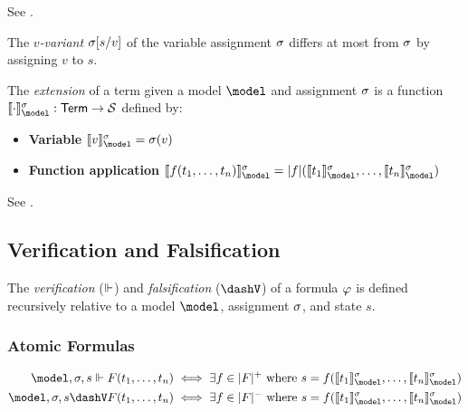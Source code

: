 \documentclass[../LogosReference.tex]{subfiles}
\begin{document}

\noindent
See .


\begin{definition}\label{def:variant-assignment}
	The \textit{$v$-variant} $\sigma[s/v]$ of the variable assignment $\sigma$ differs at most from $\sigma$ by assigning $v$ to $s$.
\end{definition}

\begin{definition}\label{def:term-extension}
	The \emph{extension} of a term given a model $\model$ and assignment $\sigma$ is a function $\sem{\cdot}^\assignment_\model : \Term \to \statespace$ defined by:
	\begin{itemize}
		\item \textbf{Variable} $\sem{v}^\assignment_\model = \assignment(v)$
		\item \textbf{Function application} $\sem{f(t_1, \ldots, t_n)}^\assignment_\model = \interp{f}(\sem{t_1}^\assignment_\model, \ldots, \sem{t_n}^\assignment_\model)$
	\end{itemize}
\end{definition}

\noindent
See .


\subsection{Verification and Falsification}\label{sec:verification-falsification}

The \emph{verification} ($\Vdash$) and \emph{falsification} ($\falsifies$) of a formula $\varphi$ is defined recursively relative to a model $\model$, assignment $\sigma$, and state $s$.

\subsubsection{Atomic Formulas}\label{sec:atomic-formulas}

\begin{definition}\label{def:atomic-verification}
	\begin{align}
    \model, \assignment, s \verifies F(t_1, \ldots, t_n)  & \iff \exists f \in \verifiertype{F} \text{ where } s = f(\sem{t_1}^\assignment_\model, \ldots, \sem{t_n}^\assignment_\model)  \\
    \model, \assignment, s \falsifies F(t_1, \ldots, t_n) & \iff \exists f \in \falsifiertype{F} \text{ where } s = f(\sem{t_1}^\assignment_\model, \ldots, \sem{t_n}^\assignment_\model)
	\end{align}
\end{definition}
\end{document}
